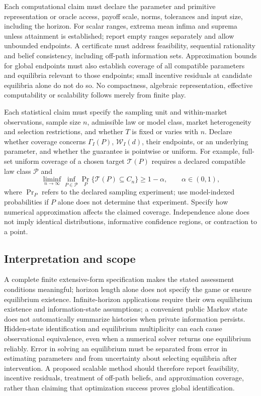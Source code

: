 \documentclass[11pt,a4paper]{article}
\begin{document}
Each computational claim must declare the parameter and primitive representation or oracle access, payoff scale, norms, tolerances and input size, including the horizon. For scalar ranges, extrema mean infima and suprema unless attainment is established; report empty ranges separately and allow unbounded endpoints. A certificate must address feasibility, sequential rationality and belief consistency, including off-path information sets. Approximation bounds for global endpoints must also establish coverage of all compatible parameters and equilibria relevant to those endpoints; small incentive residuals at candidate equilibria alone do not do so. No compactness, algebraic representation, effective computability or scalability follows merely from finite play.

Each statistical claim must specify the sampling unit and within-market observations, sample size $n$, admissible law or model class, market heterogeneity and selection restrictions, and whether $T$ is fixed or varies with $n$. Declare whether coverage concerns $\Gamma_I(P)$, $\mathcal W_I(d)$, their endpoints, or an underlying parameter, and whether the guarantee is pointwise or uniform. For example, full-set uniform coverage of a chosen target $\mathcal T(P)$ requires a declared compatible law class $\mathcal P$ and
\[
\liminf_{n\to\infty}\inf_{P\in\mathcal P}
\Pr_P\{\mathcal T(P)\subseteq C_n\}\geq1-\alpha,
\qquad \alpha\in(0,1),
\]
where $\Pr_P$ refers to the declared sampling experiment; use model-indexed probabilities if $P$ alone does not determine that experiment. Specify how numerical approximation affects the claimed coverage. Independence alone does not imply identical distributions, informative confidence regions, or contraction to a point.

\subsection*{Interpretation and scope}

A complete finite extensive-form specification makes the stated assessment conditions meaningful; horizon length alone does not specify the game or ensure equilibrium existence. Infinite-horizon applications require their own equilibrium existence and information-state assumptions; a convenient public Markov state does not automatically summarize histories when private information persists. Hidden-state identification and equilibrium multiplicity can each cause observational equivalence, even when a numerical solver returns one equilibrium reliably. Error in solving an equilibrium must be separated from error in estimating parameters and from uncertainty about selecting equilibria after intervention. A proposed scalable method should therefore report feasibility, incentive residuals, treatment of off-path beliefs, and approximation coverage, rather than claiming that optimization success proves global identification.
\end{document}
